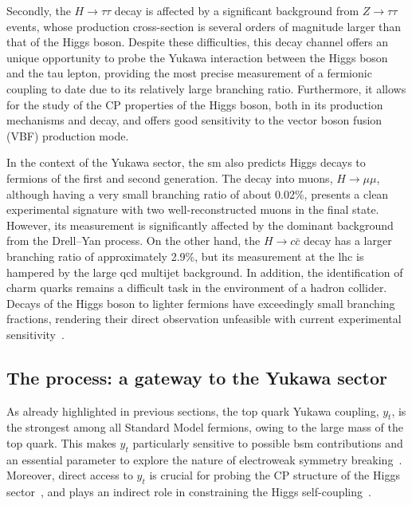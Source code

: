 Secondly, the $H \rightarrow \tau\tau$ decay is affected by a significant background from $Z \rightarrow \tau\tau$ events, whose production cross-section is several orders of magnitude larger than that of the Higgs boson. Despite these difficulties, this decay channel offers an unique opportunity to probe the Yukawa interaction between the Higgs boson and the tau lepton, providing the most precise measurement of a fermionic coupling to date due to its relatively large branching ratio. Furthermore, it allows for the study of the CP properties of the Higgs boson, both in its production mechanisms and decay, and offers good sensitivity to the vector boson fusion (VBF) production mode.

In the context of the Yukawa sector, the \acrshort{sm} also predicts Higgs decays to fermions of the first and second generation. The decay into muons, \( H \rightarrow \mu\mu \), although having a very small branching ratio of about 0.02\%, presents a clean experimental signature with two well-reconstructed muons in the final state. However, its measurement is significantly affected by the dominant background from the Drell--Yan process. On the other hand, the \( H \rightarrow c\bar{c} \) decay has a larger branching ratio of approximately 2.9\%, but its measurement at the \acrshort{lhc} is hampered by the large \acrshort{qcd} multijet background. In addition, the identification of charm quarks remains a difficult task in the environment of a hadron collider. Decays of the Higgs boson to lighter fermions have exceedingly small branching fractions, rendering their direct observation unfeasible with current experimental sensitivity~\cite{https://doi.org/10.23731/cyrm-2017-002}.

\subsection{The \ttH process: a gateway to the Yukawa sector}
\label{sec:ttH}
As already highlighted in previous sections, the top quark Yukawa coupling, $y_t$, is the strongest among all Standard Model fermions, owing to the large mass of the top quark. This makes $y_t$ particularly sensitive to possible \acrshort{bsm} contributions and an essential parameter to explore the nature of electroweak symmetry breaking~\cite{Englert:2014uua,Dobrescu:1997nm,Chivukula:1998wd,Delepine:1995qs}. Moreover, direct access to $y_t$ is crucial for probing the CP structure of the Higgs sector~\cite{Bernreuther:2002uj,Brod:2013cka}, and plays an indirect role in constraining the Higgs self-coupling~\cite{Buttazzo:2013uya,Degrassi:2016wml}.

